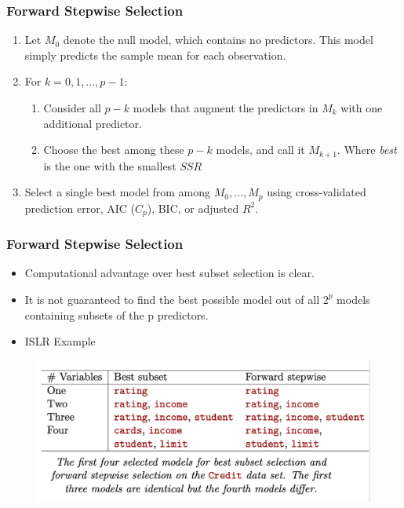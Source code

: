 \documentclass[
  shownotes,
  xcolor={svgnames},
  hyperref={colorlinks,citecolor=DarkBlue,linkcolor=DarkRed,urlcolor=DarkBlue}
  ]{beamer}
\begin{document}
\begin{frame}[fragile]
\frametitle{Forward Stepwise Selection}

\begin{enumerate}
\item Let $M_0$ denote the null model, which contains no predictors. This model simply predicts the sample mean for each observation.
\bigskip

\item  For $k=0,1,\dots,p-1$:
\medskip
\begin{enumerate}
\item Consider all $p-k$  models that augment the predictors in $M_k$ with one additional predictor.
\medskip
\item Choose the best among these $p - k$ models, and call it $M_{k+1}$. Where {\it best} is the one with the smallest $SSR$
\end{enumerate}
\bigskip
\item Select a single best model from among $M_0,\dots, M_p$ using cross-validated prediction error, AIC ($C_p$), BIC, or adjusted $R^2$.
\end{enumerate}

\end{frame}
\begin{frame}[fragile]
\frametitle{Forward Stepwise Selection}


\begin{itemize}
\item Computational advantage over best subset selection is clear.
\item  It is not guaranteed to find the best possible model out of all $2^p$ models containing subsets of the p predictors. 
\item ISLR Example
\end{itemize}

\begin{figure}[H] \centering
            \captionsetup{justification=centering}
              \includegraphics[scale=0.4]{figures/Fig2}
 \end{figure}
\end{frame}
\end{document}

